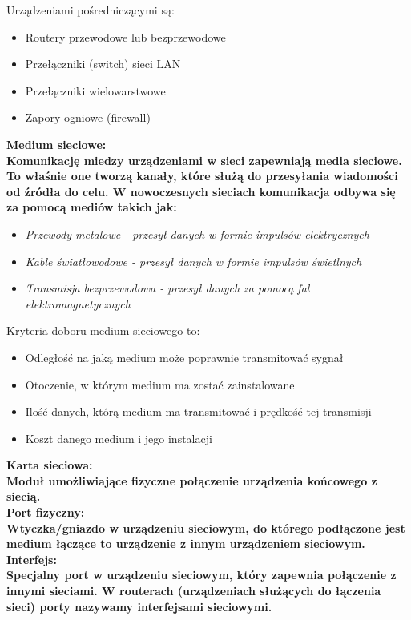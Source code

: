 \documentclass[a4paper,12pt]{article}
\newcommand{\h}[1]{\noindent \bf #1 \rm \\ \noindent}
\newcommand{\italic}[1]{\it #1 \rm}
\begin{document}
\noindent
Urządzeniami pośredniczącymi są:
\begin{itemize}
	\item Routery przewodowe lub bezprzewodowe
	\item Przełączniki (switch) sieci LAN
	\item Przełączniki wielowarstwowe 
	\item Zapory ogniowe (firewall)
\end{itemize}
\vspace{5mm}

\h{Medium sieciowe:}
Komunikację miedzy urządzeniami w sieci zapewniają media sieciowe. To właśnie one tworzą kanały, które służą do przesyłania wiadomości od źródła do celu. W nowoczesnych sieciach komunikacja odbywa się za pomocą mediów takich jak:
\begin{itemize}
	\item \italic{Przewody metalowe} - przesył danych w formie impulsów elektrycznych
	\item \italic{Kable światłowodowe} - przesył danych w formie impulsów świetlnych
	\item \italic{Transmisja bezprzewodowa} - przesył danych za pomocą fal elektromagnetycznych
\end{itemize}
\vspace{5mm}

Kryteria doboru medium sieciowego to:
\begin{itemize}
	\item Odległość na jaką medium może poprawnie transmitować sygnał
	\item Otoczenie, w którym medium ma zostać zainstalowane
	\item Ilość danych, którą medium ma transmitować i prędkość tej transmisji 
	\item Koszt danego medium i jego instalacji
\end{itemize}

\h{Karta sieciowa:}
Moduł umożliwiające fizyczne połączenie urządzenia końcowego z siecią.\\

\h{Port fizyczny:}
Wtyczka/gniazdo w urządzeniu sieciowym, do którego podłączone jest medium łączące to urządzenie z innym urządzeniem sieciowym.\\

\h{Interfejs:}
Specjalny port w urządzeniu sieciowym, który zapewnia połączenie z innymi sieciami. W routerach (urządzeniach służących do łączenia sieci) porty nazywamy interfejsami sieciowymi.\\
\end{document}
